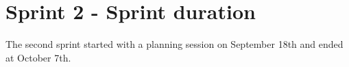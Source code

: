 \section{Sprint 2 - Sprint duration}
The second sprint started with a planning session on September 18th and ended at October 7th. 

